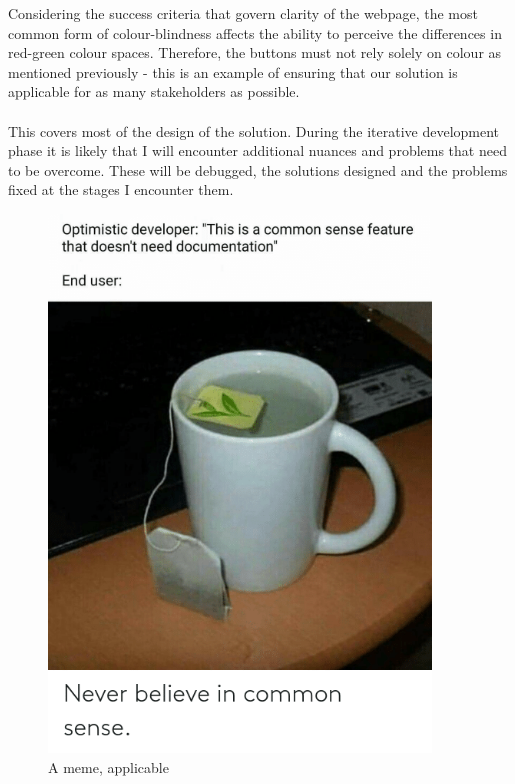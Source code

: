 \documentclass[9pt]{article}
\begin{document}
Considering the success criteria that govern clarity of the webpage, the most common form of colour-blindness affects the ability to perceive the differences in red-green colour spaces\cite{colourBlindness}. Therefore, the buttons must not rely solely on colour as mentioned previously - this is an example of ensuring that our solution is applicable for as many stakeholders as possible.\\\\
This covers most of the design of the solution. During the iterative development phase it is likely that I will encounter additional nuances and problems that need to be overcome. These will be debugged, the solutions designed and the problems fixed at the stages I encounter them.
\begin{figure}[H]
	\centering
	\includegraphics[width=4in]{figs/meme}
	\caption{A meme, applicable}
	\label{fig:meme}
\end{figure}
\newpage
\end{document}

